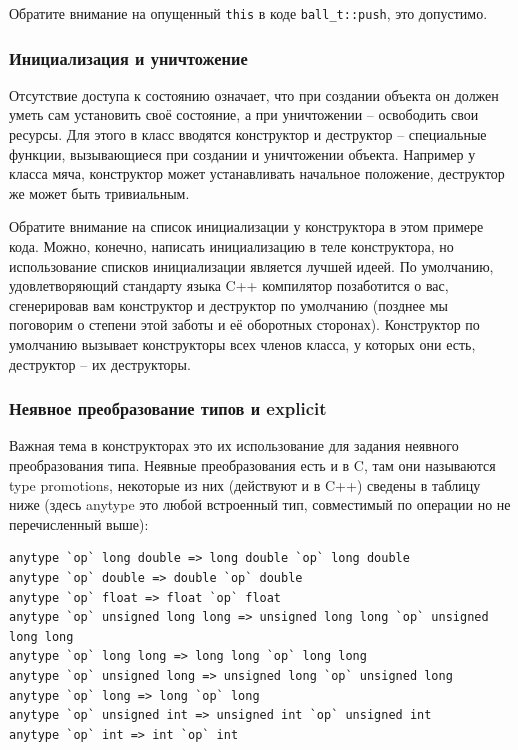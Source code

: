\documentclass[a4paper,12pt,oneside]{article}
\begin{document}
Обратите внимание на опущенный \lstinline!this! в коде \lstinline!ball_t::push!, это допустимо.

\subsubsection{Инициализация и уничтожение}

Отсутствие доступа к состоянию означает, что при создании объекта он должен уметь сам установить своё состояние, а при уничтожении – освободить свои ресурсы. Для этого в класс вводятся конструктор и деструктор – специальные функции, вызывающиеся при создании и уничтожении объекта. Например у класса мяча, конструктор может устанавливать начальное положение, деструктор же может быть тривиальным.



Обратите внимание на список инициализации у конструктора в этом примере кода. Можно, конечно, написать инициализацию в теле конструктора, но использование списков инициализации является лучшей идеей. По умолчанию, удовлетворяющий стандарту языка C++ компилятор позаботится о вас, сгенерировав вам конструктор и деструктор по умолчанию (позднее мы поговорим о степени этой заботы и её оборотных сторонах). Конструктор по умолчанию вызывает конструкторы всех членов класса, у которых они есть, деструктор -- их деструкторы.

\subsubsection{Неявное преобразование типов и explicit}

Важная тема в конструкторах это их использование для задания неявного преобразования типа. Неявные преобразования есть и в C, там они называются type promotions, некоторые из них (действуют и в C++) сведены в таблицу ниже (здесь anytype это любой встроенный тип, совместимый по операции но не перечисленный выше):

\begin{lstlisting}
anytype `op` long double => long double `op` long double
anytype `op` double => double `op` double
anytype `op` float => float `op` float
anytype `op` unsigned long long => unsigned long long `op` unsigned long long
anytype `op` long long => long long `op` long long
anytype `op` unsigned long => unsigned long `op` unsigned long
anytype `op` long => long `op` long
anytype `op` unsigned int => unsigned int `op` unsigned int
anytype `op` int => int `op` int
\end{lstlisting}
\end{document}

